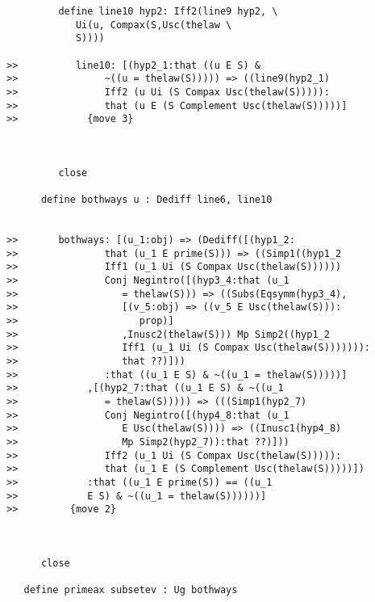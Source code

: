 \documentclass[12pt]{article}
\begin{document}
\begin{verbatim}
         define line10 hyp2: Iff2(line9 hyp2, \
            Ui(u, Compax(S,Usc(thelaw \
            S))))

>>          line10: [(hyp2_1:that ((u E S) &
>>               ~((u = thelaw(S))))) => ((line9(hyp2_1)
>>               Iff2 (u Ui (S Compax Usc(thelaw(S))))):
>>               that (u E (S Complement Usc(thelaw(S)))))]
>>            {move 3}



         close

      define bothways u : Dediff line6, line10


>>       bothways: [(u_1:obj) => (Dediff([(hyp1_2:
>>               that (u_1 E prime(S))) => ((Simp1((hyp1_2
>>               Iff1 (u_1 Ui (S Compax Usc(thelaw(S))))))
>>               Conj Negintro([(hyp3_4:that (u_1
>>                  = thelaw(S))) => ((Subs(Eqsymm(hyp3_4),
>>                  [(v_5:obj) => ((v_5 E Usc(thelaw(S))):
>>                     prop)]
>>                  ,Inusc2(thelaw(S))) Mp Simp2((hyp1_2
>>                  Iff1 (u_1 Ui (S Compax Usc(thelaw(S))))))):
>>                  that ??)]))
>>               :that ((u_1 E S) & ~((u_1 = thelaw(S)))))]
>>            ,[(hyp2_7:that ((u_1 E S) & ~((u_1
>>               = thelaw(S))))) => (((Simp1(hyp2_7)
>>               Conj Negintro([(hyp4_8:that (u_1
>>                  E Usc(thelaw(S)))) => ((Inusc1(hyp4_8)
>>                  Mp Simp2(hyp2_7)):that ??)]))
>>               Iff2 (u_1 Ui (S Compax Usc(thelaw(S))))):
>>               that (u_1 E (S Complement Usc(thelaw(S)))))])
>>            :that ((u_1 E prime(S)) == ((u_1
>>            E S) & ~((u_1 = thelaw(S))))))]
>>         {move 2}



      close

   define primeax subsetev : Ug bothways



\end{verbatim}
\end{document}

